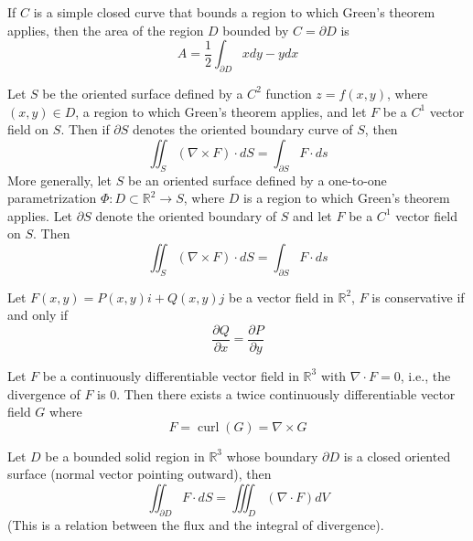 \documentclass[openany]{book}
\newcommand{\R}{\mathbb{R}}
\newcommand{\curl}{\operatorname{curl}}
\begin{document}
\begin{prop}
    If $C$ is a simple closed curve that bounds a region to which Green's theorem applies, then the area of the region $D$ bounded by $C=\partial D$ is 
    \begin{equation*}
        A=\frac{1}{2}\int_{\partial D}xdy-ydx
    \end{equation*}
\end{prop}


\begin{thm}
    Let $S$ be the oriented surface defined by a $C^2$ function $z=f(x,y)$, where $(x,y)\in D$, a region to which Green's theorem applies, and let $F$ be a $C^1$ vector field on $S$. Then if $\partial S$ denotes the oriented boundary curve of $S$, then 
    \begin{equation*}
        \iint_S(\nabla\times F)\cdot dS=\int_{\partial S}F\cdot ds
    \end{equation*}
    More generally, let $S$ be an oriented surface defined by a one-to-one parametrization $\Phi: D\subset\R^2\to S$, where $D$ is a region to which Green's theorem applies. Let $\partial S$ denote the oriented boundary of $S$ and let $F$ be a $C^1$ vector field on $S$. Then 
    \begin{equation*}
        \iint_S(\nabla\times F)\cdot dS=\int_{\partial S}F\cdot ds
    \end{equation*}
\end{thm}



\begin{prop}
    Let $F(x,y)=P(x,y)i+Q(x,y)j$ be a vector field in $\R^2$, $F$ is conservative if and only if 
    \begin{equation*}
        \frac{\partial Q}{\partial x}=\frac{\partial P}{\partial y}
    \end{equation*}
\end{prop}


\begin{prop}
    Let $F$ be a continuously differentiable vector field in $\R^3$ with $\nabla\cdot F=0$, i.e., the divergence of $F$ is $0$. Then there exists a twice continuously differentiable vector field $G$ where 
    \begin{equation*}
        F=\curl(G)=\nabla\times G
    \end{equation*}
\end{prop}


\begin{thm}
    Let $D$ be a bounded solid region in $\R^3$ whose boundary $\partial D$ is a closed oriented surface (normal vector pointing outward), then 
    \begin{equation*}
        \iint_{\partial D}F\cdot dS=\iiint_D(\nabla\cdot F)dV
    \end{equation*}
    (This is a relation between the flux and the integral of divergence).
\end{thm}
\end{document}
